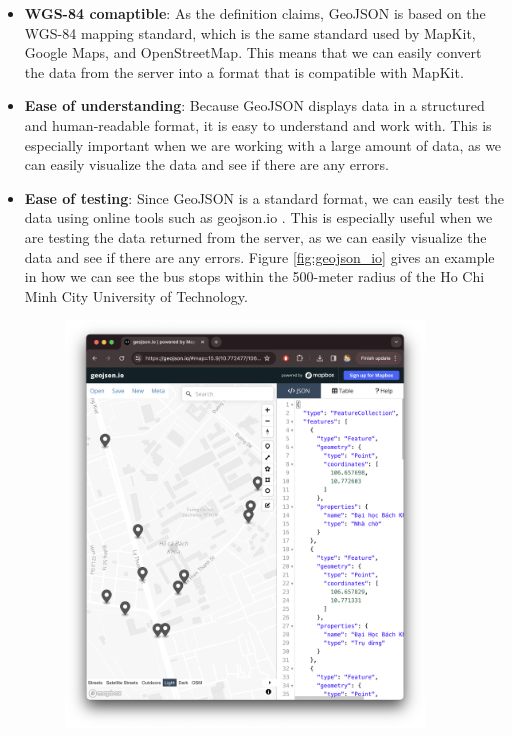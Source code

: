 \begin{itemize}
    \item \textbf{WGS-84 comaptible}: As the definition claims, GeoJSON is based on the WGS-84 mapping standard, which is the same standard used by MapKit, Google Maps, and OpenStreetMap. This means that we can easily convert the data from the server into a format that is compatible with MapKit.
    \item \textbf{Ease of understanding}: Because GeoJSON displays data in a structured and human-readable format, it is easy to understand and work with. This is especially important when we are working with a large amount of data, as we can easily visualize the data and see if there are any errors.
    \item \textbf{Ease of testing}: Since GeoJSON is a standard format, we can easily test the data using online tools such as geojson.io \cite{mapbox_geojsonio}. This is especially useful when we are testing the data returned from the server, as we can easily visualize the data and see if there are any errors. Figure \ref{fig:geojson_io} gives an example in how we can see the bus stops within the 500-meter radius of the Ho Chi Minh City University of Technology.
    \begin{figure}[H]
        \centering
        \includegraphics[width=0.9\textwidth]{assets/images/Research/geojson/geojsonio.png}

\end{figure}
\end{itemize}

